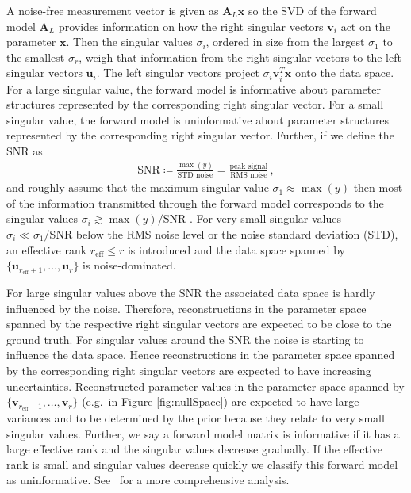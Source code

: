 A noise-free measurement vector is given as $\bm{A}_L\bm{x}$ so the SVD of the forward model $\bm{A}_L$ provides information on how the right singular vectors $\bm{v}_i$ act on the parameter $\bm{x}$.
Then the singular values $\sigma_i $, ordered in size from the largest $\sigma_1$ to the smallest $\sigma_{r}$, weigh that information from the right singular vectors to the left singular vectors $\bm{u}_i$.
The left singular vectors project $\sigma_i \bm{v}^T_i \bm{x} $ onto the data space.
For a large singular value, the forward model is informative about parameter structures represented by the corresponding right singular vector. 
For a small singular value, the forward model is uninformative about parameter structures represented by the corresponding right singular vector.
Further, if we define the SNR as
\begin{align}
	\text{SNR} \coloneqq \frac{\max(y)}{\text{STD noise}} = \frac{\text{peak signal}}{\text{RMS noise}} \label{eq:SNR} \, ,
\end{align}
and roughly assume that the maximum singular value $\sigma_1  \approx \max(y)$ then most of the information transmitted through the forward model corresponds to the singular values $\sigma_i \gtrsim \max(y)/ \text{SNR}$ \cite{fox2025BlokkLecNot}.
For very small singular values $\sigma_i \ll \sigma_1/\text{SNR}$ below the RMS noise level or the noise standard deviation (STD), an effective rank $r_{\text{eff}} \leq r$ is introduced and the data space spanned by $ \{\bm{u}_{r_{\text{eff}} +1}, \dots ,\bm{u}_r \}$ is noise-dominated.

For large singular values above the SNR the associated data space is hardly influenced by the noise.
Therefore, reconstructions in the parameter space spanned by the respective right singular vectors are expected to be close to the ground truth.
For singular values around the SNR the noise is starting to influence the data space.
Hence reconstructions in the parameter space spanned by the corresponding right singular vectors are expected to have increasing uncertainties.
Reconstructed parameter values in the parameter space spanned by $ \{\bm{v}_{r_{\text{eff}} +1}, \dots ,\bm{v}_r \}$ (e.g.~in Figure \ref{fig:nullSpace}) are expected to have large variances and to be determined by the prior because they relate to very small singular values.
Further, we say a forward model matrix is informative if it has a large effective rank and the singular values decrease gradually.
If the effective rank is small and singular values decrease quickly we classify this forward model as uninformative.
See~\cite{tan2016LecNot} for a more comprehensive analysis.

